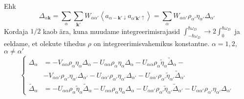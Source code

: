 \documentclass[class=article, crop=false]{standalone}
\begin{document}
Ehk
\begin{equation}\label{key}
	\Delta_{ \alpha \mathbf{k}} = \sum_{ \alpha} \sum_{ \mathbf{k}'} W_{ \alpha \alpha'} \left\langle a_{ \alpha -\mathbf{k}' \downarrow} a_{ \alpha' \mathbf{k}' \uparrow} \right\rangle = \sum_{ \alpha} W_{ \alpha \alpha'} \rho_{ \alpha'} \eta_{ \alpha'} \Delta_{ \alpha'}
\end{equation}
Kordaja $ 1/2 $ kaob ära, kuna muudame integreerimisrajasid $ \int_{- \hbar \omega_{D}}^{ \hbar \omega_{D}} \rightarrow 2 \int_{0}^{ \hbar \omega_{D}} $ ja eeldame, et olekute tihedus $ \rho $ on integreerimisvahemikus konstantne. $ \alpha = 1,2 $, $ \alpha \neq \alpha' $
\begin{equation}\label{key}
	\begin{cases}
		\Delta_{ \alpha} & = - V_{ \alpha \alpha} \rho_{ \alpha} \eta_{ \alpha} \Delta_{ \alpha} - U_{ \alpha \alpha} \rho_{ \alpha} \eta_{ \alpha} \Delta_{ \alpha} - U_{ \alpha \alpha} \rho_{ \alpha} \tilde{ \eta}_{ \alpha} \tilde{ \Delta}_{ \alpha} - \\
		& - V_{ \alpha \alpha'} \rho_{ \alpha'} \eta_{ \alpha'} \Delta_{ \alpha'} - U_{ \alpha \alpha'} \rho_{ \alpha'} \eta_{ \alpha'} \Delta_{ \alpha'} - U_{ \alpha \alpha'} \rho_{ \alpha'} \tilde{ \eta}_{ \alpha'} \tilde{ \Delta}_{ \alpha'} \\
		\tilde{ \Delta}_{ \alpha} & = - U_{ \alpha \alpha} \rho_{ \alpha} \tilde{ \eta}_{ \alpha} \tilde{ \Delta}_{ \alpha} - U_{ \alpha \alpha} \rho_{ \alpha} \eta_{ \alpha} \Delta_{ \alpha} - U_{ \alpha \alpha'} \rho_{ \alpha'} \tilde{ \eta}_{ \alpha'} \tilde{ \Delta}_{ \alpha'} - U_{ \alpha \alpha'} \rho_{ \alpha'} \eta_{ \alpha'} \Delta_{ \alpha'}
	\end{cases}
\end{equation}
\end{document}
